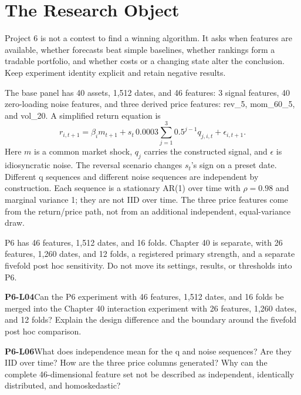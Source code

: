\clearpage\section{The Research Object}
\color{inkiron}
\begin{strand}
Project 6 is not a contest to find a winning algorithm. It asks when features are available, whether forecasts beat simple baselines, whether rankings form a tradable portfolio, and whether costs or a changing state alter the conclusion. Keep experiment identity explicit and retain negative results.
\end{strand}
\begin{definition}
The base panel has 40 assets, 1,512 dates, and 46 features: 3 signal features, 40 zero-loading noise features, and three derived price features: rev\_5, mom\_60\_5, and vol\_20. A simplified return equation is
\[
r_{i,t+1}=\beta_i m_{t+1}+s_t\,0.0003\sum_{j=1}^{3}0.5^{j-1}q_{j,i,t}+\epsilon_{i,t+1}.
\]
Here \(m\) is a common market shock, \(q_j\) carries the constructed signal, and \(\epsilon\) is idiosyncratic noise. The reversal scenario changes \(s_t\)'s sign on a preset date. Different q sequences and different noise sequences are independent by construction. Each sequence is a stationary AR(1) over time with \(\rho=0.98\) and marginal variance 1; they are not IID over time. The three price features come from the return/price path, not from an additional independent, equal-variance draw.
\end{definition}
P6 has 46 features, 1,512 dates, and 16 folds. Chapter 40 is separate, with 26 features, 1,260 dates, and 12 folds, a registered primary strength, and a separate fivefold post hoc sensitivity. Do not move its settings, results, or thresholds into P6.
\begin{yourturn}\textbf{P6-L04}\quad Can the P6 experiment with 46 features, 1,512 dates, and 16 folds be merged into the Chapter 40 interaction experiment with 26 features, 1,260 dates, and 12 folds? Explain the design difference and the boundary around the fivefold post hoc comparison.\workspace[4]\end{yourturn}
\begin{yourturn}\textbf{P6-L06}\quad What does independence mean for the q and noise sequences? Are they IID over time? How are the three price columns generated? Why can the complete 46-dimensional feature set not be described as independent, identically distributed, and homoskedastic?\workspace[4]\end{yourturn}

